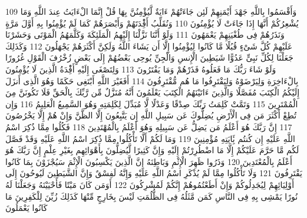 \documentclass[20pt,a4paper]{article}
\begin{document}
{\tiny\colorbox{cl_aya}{109}} وَأَقْسَمُوا بِاللَّهِ جَهْدَ أَيْمَنِهِمْ لَئِن جَاءَتْهُمْ ءَايَةٌ لَّيُؤْمِنُنَّ بِهَا قُلْ إِنَّمَا الْءَايَتُ عِندَ اللَّهِ وَمَا يُشْعِرُكُمْ أَنَّهَا إِذَا جَاءَتْ لَا يُؤْمِنُونَ
{\tiny\colorbox{cl_aya}{110}} وَنُقَلِّبُ أَفِْٔدَتَهُمْ وَأَبْصَرَهُمْ كَمَا لَمْ يُؤْمِنُوا بِهِ أَوَّلَ مَرَّةٍ وَنَذَرُهُمْ فِى طُغْيَنِهِمْ يَعْمَهُونَ
{\tiny\colorbox{cl_aya}{111}} وَلَوْ أَنَّنَا نَزَّلْنَا إِلَيْهِمُ الْمَلَئِكَةَ وَكَلَّمَهُمُ الْمَوْتَى وَحَشَرْنَا عَلَيْهِمْ كُلَّ شَىْءٍ قُبُلًا مَّا كَانُوا لِيُؤْمِنُوا إِلَّا أَن يَشَاءَ اللَّهُ وَلَكِنَّ أَكْثَرَهُمْ يَجْهَلُونَ
{\tiny\colorbox{cl_aya}{112}} وَكَذَلِكَ جَعَلْنَا لِكُلِّ نَبِىٍّ عَدُوًّا شَيَطِينَ الْإِنسِ وَالْجِنِّ يُوحِى بَعْضُهُمْ إِلَى بَعْضٍ زُخْرُفَ الْقَوْلِ غُرُورًا وَلَوْ شَاءَ رَبُّكَ مَا فَعَلُوهُ فَذَرْهُمْ وَمَا يَفْتَرُونَ
{\tiny\colorbox{cl_aya}{113}} وَلِتَصْغَى إِلَيْهِ أَفِْٔدَةُ الَّذِينَ لَا يُؤْمِنُونَ بِالْءَاخِرَةِ وَلِيَرْضَوْهُ وَلِيَقْتَرِفُوا مَا هُم مُّقْتَرِفُونَ
{\tiny\colorbox{cl_aya}{114}} أَفَغَيْرَ اللَّهِ أَبْتَغِى حَكَمًا وَهُوَ الَّذِى أَنزَلَ إِلَيْكُمُ الْكِتَبَ مُفَصَّلًا وَالَّذِينَ ءَاتَيْنَهُمُ الْكِتَبَ يَعْلَمُونَ أَنَّهُ مُنَزَّلٌ مِّن رَّبِّكَ بِالْحَقِّ فَلَا تَكُونَنَّ مِنَ الْمُمْتَرِينَ
{\tiny\colorbox{cl_aya}{115}} وَتَمَّتْ كَلِمَتُ رَبِّكَ صِدْقًا وَعَدْلًا لَّا مُبَدِّلَ لِكَلِمَتِهِ وَهُوَ السَّمِيعُ الْعَلِيمُ
{\tiny\colorbox{cl_aya}{116}} وَإِن تُطِعْ أَكْثَرَ مَن فِى الْأَرْضِ يُضِلُّوكَ عَن سَبِيلِ اللَّهِ إِن يَتَّبِعُونَ إِلَّا الظَّنَّ وَإِنْ هُمْ إِلَّا يَخْرُصُونَ
{\tiny\colorbox{cl_aya}{117}} إِنَّ رَبَّكَ هُوَ أَعْلَمُ مَن يَضِلُّ عَن سَبِيلِهِ وَهُوَ أَعْلَمُ بِالْمُهْتَدِينَ
{\tiny\colorbox{cl_aya}{118}} فَكُلُوا مِمَّا ذُكِرَ اسْمُ اللَّهِ عَلَيْهِ إِن كُنتُم بَِٔايَتِهِ مُؤْمِنِينَ
{\tiny\colorbox{cl_aya}{119}} وَمَا لَكُمْ أَلَّا تَأْكُلُوا مِمَّا ذُكِرَ اسْمُ اللَّهِ عَلَيْهِ وَقَدْ فَصَّلَ لَكُم مَّا حَرَّمَ عَلَيْكُمْ إِلَّا مَا اضْطُرِرْتُمْ إِلَيْهِ وَإِنَّ كَثِيرًا لَّيُضِلُّونَ بِأَهْوَائِهِم بِغَيْرِ عِلْمٍ إِنَّ رَبَّكَ هُوَ أَعْلَمُ بِالْمُعْتَدِينَ
{\tiny\colorbox{cl_aya}{120}} وَذَرُوا ظَهِرَ الْإِثْمِ وَبَاطِنَهُ إِنَّ الَّذِينَ يَكْسِبُونَ الْإِثْمَ سَيُجْزَوْنَ بِمَا كَانُوا يَقْتَرِفُونَ
{\tiny\colorbox{cl_aya}{121}} وَلَا تَأْكُلُوا مِمَّا لَمْ يُذْكَرِ اسْمُ اللَّهِ عَلَيْهِ وَإِنَّهُ لَفِسْقٌ وَإِنَّ الشَّيَطِينَ لَيُوحُونَ إِلَى أَوْلِيَائِهِمْ لِيُجَدِلُوكُمْ وَإِنْ أَطَعْتُمُوهُمْ إِنَّكُمْ لَمُشْرِكُونَ
{\tiny\colorbox{cl_aya}{122}} أَوَمَن كَانَ مَيْتًا فَأَحْيَيْنَهُ وَجَعَلْنَا لَهُ نُورًا يَمْشِى بِهِ فِى النَّاسِ كَمَن مَّثَلُهُ فِى الظُّلُمَتِ لَيْسَ بِخَارِجٍ مِّنْهَا كَذَلِكَ زُيِّنَ لِلْكَفِرِينَ مَا كَانُوا يَعْمَلُونَ
\end{document}
